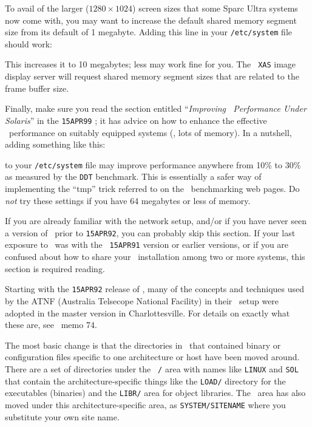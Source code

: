 To avail of the larger ($1280 \times 1024$) screen sizes that some Sparc
Ultra systems now come with, you may want to increase the default shared
memory segment size from its default of 1 megabyte.  Adding this line in
your {\tt /etc/system} file should work:\medskip

\medskip

This increases it to 10 megabytes; less may work fine for you.  The {\tt
XAS} image display server will request shared memory segment sizes that
are related to the frame buffer size.

Finally, make sure you read the section entitled ``{\it Improving \AIPS\
Performance Under Solaris}'' in the {\tt 15APR99} ;
it has advice on how to enhance the effective \AIPS\ performance on
suitably equipped systems (\ie, lots of memory).  In a nutshell, adding
something like this:\medskip

\medskip

\noindent to your {\tt /etc/system} file may improve performance
anywhere from 10\% to 30\% as measured by the {\tt DDT} benchmark.  This
is essentially a safer way of implementing the ``tmp'' trick referred to
on the \AIPS\ benchmarking web pages.  Do {\it not\/} try these settings
if you have 64 megabytes or less of memory.

\vfill\eject%

If you are already familiar with the network setup, and/or if you have
never seen a version of \AIPS\ prior to {\tt 15APR92}, you can probably
skip this section.  If your last exposure to \AIPS\ was with the {\tt
15APR91} version or earlier versions, or if you are confused about how
to share your \AIPS\ installation among two or more systems, this
section is required reading.

Starting with the {\tt 15APR92} release of \AIPS, many of the concepts
and techniques used by the ATNF (Australia Telsecope National Facility)
in their \AIPS\ setup were adopted in the master version in
Charlottesville.  For details on exactly what these are, see \AIPS\ memo
74.

The most basic change is that the directories in \AIPS\ that contained
binary or configuration files specific to one architecture or host have
been moved around.  There are a set of directories under the {\tt
\THISVER/} area with names like {\tt LINUX} and {\tt SOL} that contain
the architecture-specific things like the {\tt LOAD/} directory for the
executables (binaries) and the {\tt LIBR/} area for object libraries.
The \SYSL\ area has also moved under this architecture-specific area, as
{\tt SYSTEM/SITENAME} where you substitute your own site name.

